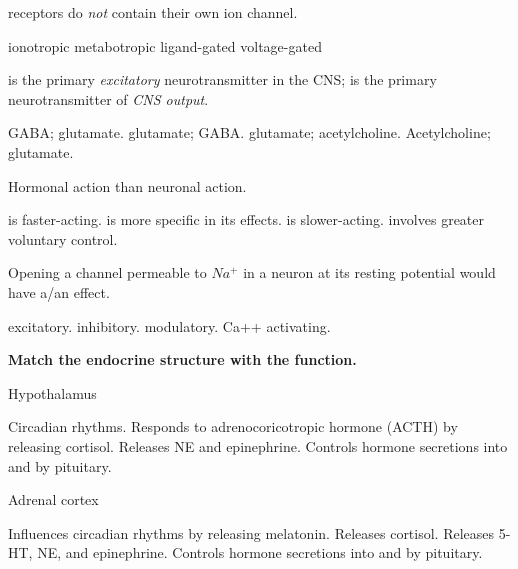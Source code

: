 \documentclass[answers]{exam}
\begin{document}
\begin{questions}
\question \fillin receptors do \emph{not} contain their own ion channel.
\begin{choices}
\choice ionotropic
\correctchoice metabotropic
\choice ligand-gated
\choice voltage-gated
\end{choices}

\question \fillin is the primary \emph{excitatory} neurotransmitter in the CNS; \fillin is the primary neurotransmitter of \emph{CNS output}.
\begin{choices}
\choice GABA; glutamate.
\choice glutamate; GABA.
\correctchoice glutamate; acetylcholine.
\choice Acetylcholine; glutamate.
\end{choices}

\question Hormonal action \fillin than neuronal action.
\begin{choices}
\choice is faster-acting.
\choice is more specific in its effects.
\correctchoice is slower-acting.
\choice involves greater voluntary control.
\end{choices}

\question Opening a channel permeable to $Na^+$ in a neuron at its resting potential would have a/an \fillin effect.
\begin{choices}
\correctchoice excitatory.
\choice inhibitory.
\choice modulatory.
\choice Ca++ activating.
\end{choices}

\newpage

\textbf{Match the endocrine structure with the function.}

\question Hypothalamus
\begin{choices}
\choice Circadian rhythms.
\choice Responds to adrenocoricotropic hormone (ACTH) by releasing cortisol.
\choice Releases NE and epinephrine.
\correctchoice Controls hormone secretions into and by pituitary.
\end{choices}


\question Adrenal cortex
\begin{choices}
\choice Influences circadian rhythms by releasing melatonin.
\correctchoice Releases cortisol.
\choice Releases 5-HT, NE, and epinephrine.
\choice Controls hormone secretions into and by pituitary.
\end{choices}


\end{questions}
\end{document}
